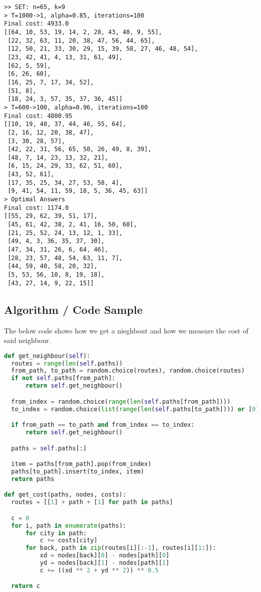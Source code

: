 \documentclass[12pt]{article}
\begin{document}
\begin{lstlisting}[breaklines=true]
>> SET: n=65, k=9
> T=1000->1, alpha=0.85, iterations=100
Final cost: 4933.0
[[64, 10, 53, 19, 14, 2, 28, 43, 40, 9, 55],
 [22, 32, 63, 11, 20, 38, 47, 56, 44, 65],
 [12, 50, 21, 33, 30, 29, 15, 39, 58, 27, 46, 48, 54],
 [23, 42, 41, 4, 13, 31, 61, 49],
 [62, 5, 59],
 [6, 26, 60],
 [16, 25, 7, 17, 34, 52],
 [51, 8],
 [18, 24, 3, 57, 35, 37, 36, 45]]
> T=600->100, alpha=0.96, iterations=100
Final cost: 4800.95
[[10, 19, 40, 37, 44, 46, 55, 64],
 [2, 16, 12, 20, 38, 47],
 [3, 30, 28, 57],
 [42, 22, 31, 56, 65, 50, 26, 49, 8, 39],
 [48, 7, 14, 23, 13, 32, 21],
 [6, 15, 24, 29, 33, 62, 51, 60],
 [43, 52, 61],
 [17, 35, 25, 34, 27, 53, 58, 4],
 [9, 41, 54, 11, 59, 18, 5, 36, 45, 63]]
> Optimal Answers
Final cost: 1174.0
[[55, 29, 62, 39, 51, 17],
 [45, 61, 42, 38, 2, 41, 16, 50, 60],
 [21, 25, 52, 24, 13, 12, 1, 33],
 [49, 4, 3, 36, 35, 37, 30],
 [47, 34, 31, 26, 6, 64, 46],
 [28, 23, 57, 48, 54, 63, 11, 7],
 [44, 59, 40, 58, 20, 32],
 [5, 53, 56, 10, 8, 19, 18],
 [43, 27, 14, 9, 22, 15]]
\end{lstlisting}

\subsection*{Algorithm / Code Sample}
The below code shows how we get a nieghbout and how we measure the cost of said neighbour.

\begin{lstlisting}[breaklines=true,language=python]
def get_neighbour(self):
  routes = range(len(self.paths))
  from_path, to_path = random.choice(routes), random.choice(routes)
  if not self.paths[from_path]:
      return self.get_neighbour()

  from_index = random.choice(range(len(self.paths[from_path])))
  to_index = random.choice(list(range(len(self.paths[to_path]))) or [0])

  if from_path == to_path and from_index == to_index:
      return self.get_neighbour()

  paths = self.paths[:]

  item = paths[from_path].pop(from_index)
  paths[to_path].insert(to_index, item)
  return paths

def get_cost(paths, nodes, costs):
  routes = [[1] + path + [1] for path in paths]

  c = 0
  for i, path in enumerate(paths):
      for city in path:
          c += costs[city]
      for back, path in zip(routes[i][:-1], routes[i][1:]):
          xd = nodes[back][0] - nodes[path][0]
          yd = nodes[back][1] - nodes[path][1]
          c += ((xd ** 2 + yd ** 2)) ** 0.5

  return c
\end{lstlisting}
\end{document}
